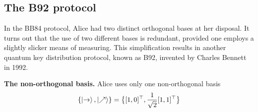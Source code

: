 \documentclass{easyclass}
\begin{document}
\subsection{The B92 protocol}
In the BB84 protocol, Alice had two distinct orthogonal bases at her disposal. It turns out that the use of two different bases is redundant, provided one employs a slightly slicker means of measuring. This simplification results in another quantum key distribution protocol, known as B92, invented by Charles Bennett in 1992.

\textbf{The non-orthogonal basis.} Alice uses only one non-orthogonal basis 
\begin{equation}
	\{\ket{\rightarrow},\ket{\nearrow}\}=\big{\{}[1,0]^{\top},\frac{1}{\sqrt{2}}[1,1]^{\top}\big{\}}
\end{equation}
\end{document}
